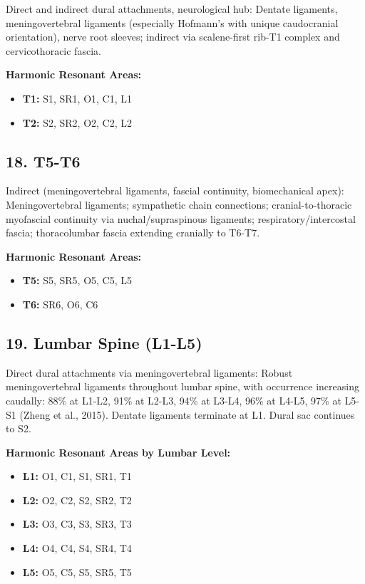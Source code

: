 \documentclass[11pt,letterpaper]{article}
\begin{document}
Direct and indirect dural attachments, neurological hub: Dentate ligaments, meningovertebral ligaments (especially Hofmann's with unique caudocranial orientation), nerve root sleeves; indirect via scalene-first rib-T1 complex and cervicothoracic fascia.


\textbf{Harmonic Resonant Areas:}

\begin{itemize}
\item \textbf{T1:} S1, SR1, O1, C1, L1
\item \textbf{T2:} S2, SR2, O2, C2, L2
\end{itemize}


\subsection{18. T5-T6}

Indirect (meningovertebral ligaments, fascial continuity, biomechanical apex): Meningovertebral ligaments; sympathetic chain connections; cranial-to-thoracic myofascial continuity via nuchal/supraspinous ligaments; respiratory/intercostal fascia; thoracolumbar fascia extending cranially to T6-T7.


\textbf{Harmonic Resonant Areas:}

\begin{itemize}
\item \textbf{T5:} S5, SR5, O5, C5, L5
\item \textbf{T6:} SR6, O6, C6
\end{itemize}


\subsection{19. Lumbar Spine (L1-L5)}

Direct dural attachments via meningovertebral ligaments: Robust meningovertebral ligaments throughout lumbar spine, with occurrence increasing caudally: 88\% at L1-L2, 91\% at L2-L3, 94\% at L3-L4, 96\% at L4-L5, 97\% at L5-S1 (Zheng et al., 2015). Dentate ligaments terminate at L1. Dural sac continues to S2.


\textbf{Harmonic Resonant Areas by Lumbar Level:}

\begin{itemize}
\item \textbf{L1:} O1, C1, S1, SR1, T1
\item \textbf{L2:} O2, C2, S2, SR2, T2
\item \textbf{L3:} O3, C3, S3, SR3, T3
\item \textbf{L4:} O4, C4, S4, SR4, T4
\item \textbf{L5:} O5, C5, S5, SR5, T5
\end{itemize}
\end{document}
